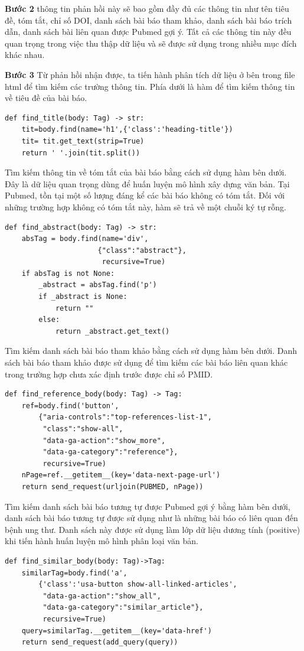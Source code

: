 \documentclass[../DoAn.tex]{subfiles}
\begin{document}
\textbf{Bước 2} thông tin phản hồi này sẽ bao gồm đầy đủ các thông tin như tên tiêu đề, tóm tắt, chỉ số DOI, danh sách bài báo tham khảo, danh sách bài báo trích dẫn, danh sách bài liên quan được Pubmed gợi ý. Tất cả các thông tin này đều quan trọng trong việc thu thập dữ liệu và sẽ được sử dụng trong nhiều mục đích khác nhau.

\textbf{Bước 3} Từ phản hồi nhận được, ta tiến hành phân tích dữ liệu ở bên trong file html để tìm kiếm các trường thông tin. Phía dưới là hàm để tìm kiếm thông tin về tiêu đề của bài báo.
\begin{lstlisting}
def find_title(body: Tag) -> str:
    tit=body.find(name='h1',{'class':'heading-title'})
    tit= tit.get_text(strip=True)
    return ' '.join(tit.split())
\end{lstlisting}

Tìm kiếm thông tin về tóm tắt của bài báo bằng cách sử dụng hàm bên dưới. Đây là dữ liệu quan trọng dùng để huấn luyện mô hình xây dựng văn bản. Tại Pubmed, tồn tại một số lượng đáng kể các bài báo không có tóm tắt. Đối với những trường hợp không có tóm tắt này, hàm sẽ trả về một chuỗi ký tự rỗng.
\begin{lstlisting}
def find_abstract(body: Tag) -> str:
    absTag = body.find(name='div',
                      {"class":"abstract"},
                       recursive=True)
    if absTag is not None:
        _abstract = absTag.find('p')
        if _abstract is None:
            return ""
        else:
            return _abstract.get_text()
\end{lstlisting}

Tìm kiếm danh sách bài báo tham khảo bằng cách sử dụng hàm bên dưới. Danh sách bài báo tham khảo được sử dụng để tìm kiếm các bài báo liên quan khác trong trường hợp chưa xác định trước được chỉ số PMID.
\begin{lstlisting}
def find_reference_body(body: Tag) -> Tag:
    ref=body.find('button',
        {"aria-controls":"top-references-list-1",
         "class":"show-all",
         "data-ga-action":"show_more",
         "data-ga-category":"reference"},
         recursive=True)
    nPage=ref.__getitem__(key='data-next-page-url')
    return send_request(urljoin(PUBMED, nPage))
\end{lstlisting}

Tìm kiếm danh sách bài báo tương tự được Pubmed gợi ý bằng hàm bên dưới, danh sách bài báo tương tự được sử dụng như là những bài báo có liên quan đến bệnh ung thư. Danh sách này được sử dụng làm lớp dữ liệu dương tính (positive) khi tiến hành huấn luyện mô hình phân loại văn bản.
\begin{lstlisting}
def find_similar_body(body: Tag)->Tag:
    similarTag=body.find('a',
        {'class':'usa-button show-all-linked-articles', 
         "data-ga-action":"show_all", 
         "data-ga-category":"similar_article"},
         recursive=True)
    query=similarTag.__getitem__(key='data-href')
    return send_request(add_query(query))
\end{lstlisting}
\end{document}
